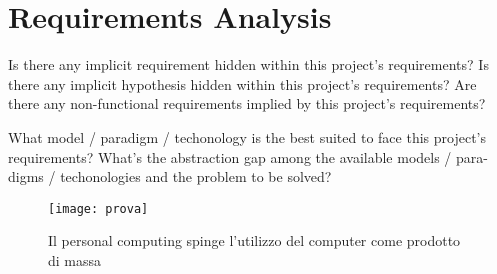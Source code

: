 \section{Requirements Analysis}

Is there any implicit requirement hidden within this project's requirements?
%
Is there any implicit hypothesis hidden within this project's requirements?
%
Are there any non-functional requirements implied by this project's requirements?

What model / paradigm / techonology is the best suited to face this project's requirements?
%
What's the abstraction gap among the available models / para-digms / techonologies and the problem to be solved?

\begin{figure}[H]
	\centering
	\texttt{[image: prova]}
	\caption{Il personal computing spinge l'utilizzo del computer come prodotto di massa}
	\label{fig:figure1}
\end{figure}